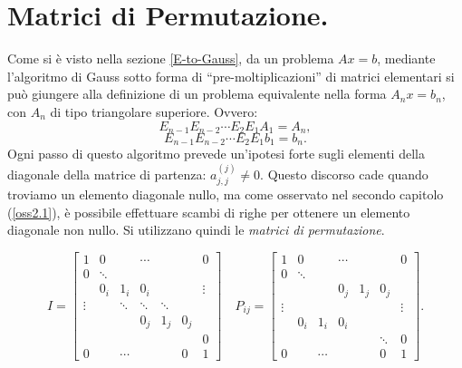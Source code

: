 \section{Matrici di Permutazione.}
Come si è visto nella sezione \ref{E-to-Gauss}, da un problema $Ax = b$,
mediante l'algoritmo di Gauss sotto forma di ``pre-moltiplicazioni'' di
matrici elementari si può giungere alla definizione di un problema equivalente
nella forma $A_nx = b_n$, con $A_n$ di tipo triangolare superiore.
Ovvero:
\[
E_{n-1}E_{n-2} \cdots E_2E_1A_1 = A_n,
\]
\[
E_{n-1}E_{n-2} \cdots E_2E_1b_1 = b_n.
\]
Ogni passo di questo algoritmo prevede un'ipotesi forte sugli elementi della
diagonale della matrice di partenza: $a_{j,j}^{(j)} \neq 0$. Questo discorso
cade quando troviamo un elemento diagonale nullo, ma come osservato nel
secondo capitolo (\ref{oss2.1}), è possibile effettuare scambi di righe
per ottenere un elemento diagonale non nullo. Si utilizzano quindi le
\emph{matrici di permutazione}.

\[
I = \left[\begin{array}{ccccccc}
1       & 0      &        & \cdots &        &   & 0 \\
0       & \ddots &        &        &        &   &   \\
        &    0_i   & 1_i    &  0_i     &        &   & \vdots  \\
\vdots  &        & \ddots & \ddots & \ddots &   &   \\
        &        &        & 0_j      & 1_j    & 0_j &   \\
        &        &        &        &        &   & 0 \\
0       &        & \cdots   &      &        & 0 & 1
\end{array}\right]
\quad
P_{ij} =\left[\begin{array}{ccccccc}
1       & 0      &        & \cdots &        &   & 0 \\
0       & \ddots &        &        &        &   &   \\
        &        &        & 0_j      & 1_j    & 0_j &   \\
\vdots  &        &  &  & &   & \vdots  \\
        &    0_i   & 1_i    &  0_i     &        &   &  \\
        &        &        &        &        & \ddots  & 0 \\
0       &        & \cdots   &      &        & 0 & 1
\end{array}\right].
\]

